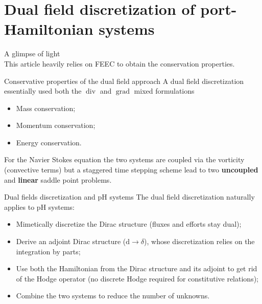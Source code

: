 \documentclass[aspectratio=169]{beamer}
\DeclareMathOperator*{\grad}{grad}
\renewcommand{\div}{\operatorname{div}}
\begin{document}
\section{Dual field discretization of port-Hamiltonian systems}

\begin{frame}{A glimpse of light}
	\\
	\vspace{.5cm}
	This article heavily relies on FEEC to obtain the conservation properties.
	\begin{block}{Conservative properties of the dual field approach}
		A dual field discretization essentially used both the $\div$ and $\grad$ mixed formulations
		\begin{itemize}
			\item[\textcolor{green}{\checkmark}] Mass conservation;
			\item[\textcolor{green}{\checkmark}] Momentum conservation;
			\item[\textcolor{green}{\checkmark}] Energy conservation.
		\end{itemize}
		For the Navier Stokes equation the two systems are coupled via the vorticity (convective terms) but a staggered time stepping scheme lead to two \textbf{uncoupled} and \textbf{linear} saddle point problems.
	\end{block}
	
\end{frame}

\begin{frame}{Dual fields discretization and pH systems}
	The dual field discretization naturally applies to pH systems:
	\begin{itemize}
		\item<2-> Mimetically discretize the Dirac structure (fluxes and efforts stay dual);
		\item<3-> Derive an adjoint Dirac structure ($\mathrm{d} \rightarrow \delta$), whose discretization relies on the integration by parts;
		\item<4-> Use both the Hamiltonian from the Dirac structure and its adjoint to get rid of the Hodge operator (no discrete Hodge required for constitutive relations);
		\item<5-> Combine the two systems to reduce the number of unknowns.
	\end{itemize}
\end{frame}
\end{document}

